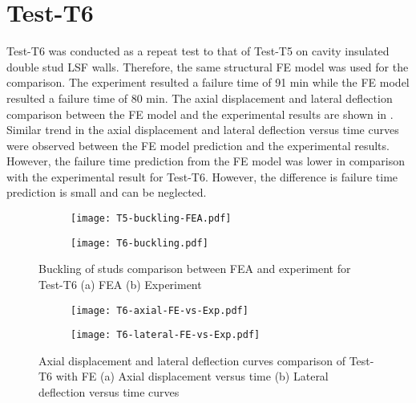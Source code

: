 \section*{Test-T6}

Test-T6 was conducted as a repeat test to that of Test-T5 on cavity insulated double stud LSF walls. Therefore, the same structural FE model was used for the comparison. The experiment resulted a failure time of 91 min while the FE model resulted a failure time of 80 min. The axial displacement and lateral deflection comparison between the FE model and the experimental results are shown in . Similar trend in the axial displacement and lateral deflection versus time curves were observed between the FE model prediction and the experimental results. However, the failure time prediction from the FE model was lower in comparison with the experimental result for Test-T6. However, the difference is failure time prediction is small and can be neglected.      
\begin{figure}[!htbp]
	\centering
	\begin{subfigure}[b]{0.85\textwidth}
		\centering
		\texttt{[image: T5-buckling-FEA.pdf]}
		\caption{}
		\label{subfig:T6-buckling-FEA}
	\end{subfigure}
	\begin{subfigure}[b]{0.35\textwidth}
		\centering
		\texttt{[image: T6-buckling.pdf]}
		\caption{}
		\label{subfig:T6-buckling-FEA-Exp}
	\end{subfigure}
	   \caption{Buckling of studs comparison between FEA and experiment for Test-T6 (a) FEA (b) Experiment}
	   \label{fig:T6-buckling-FE-vs-Exp}
\end{figure} 
\begin{figure}[!htbp]
	\centering
	\begin{subfigure}[b]{0.45\textwidth}
		\centering
		\texttt{[image: T6-axial-FE-vs-Exp.pdf]}
		\caption{}
		\label{subfig:T6-axial-FE-vs-Exp}
	\end{subfigure}
	\begin{subfigure}[b]{0.45\textwidth}
		\centering
		\texttt{[image: T6-lateral-FE-vs-Exp.pdf]}
		\caption{}
		\label{subfig:T6-lateral-FE-vs-Exp}
	\end{subfigure}
	   \caption{Axial displacement and lateral deflection curves comparison of Test-T6 with FE (a) Axial displacement versus time (b) Lateral deflection versus time curves}
	   \label{fig:T6-structural-FE-vs-Exp}
\end{figure} 

